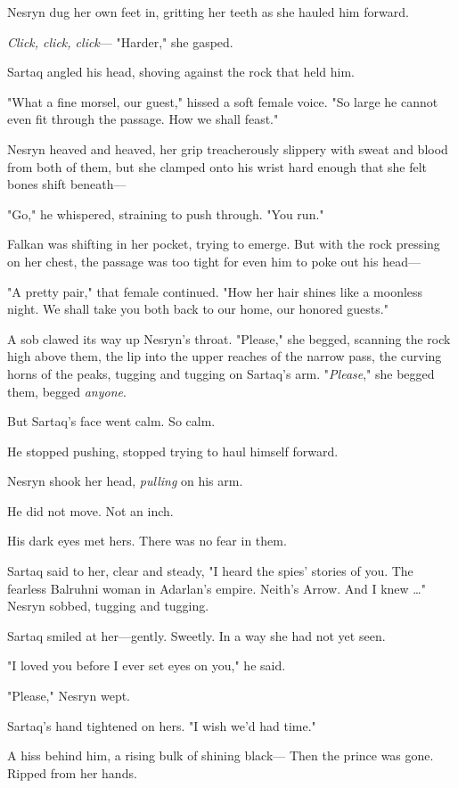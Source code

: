 Nesryn dug her own feet in, gritting her teeth as she hauled him forward.

\emph{Click, click, click}--- "Harder," she gasped.

Sartaq angled his head, shoving against the rock that held him.

"What a fine morsel, our guest," hissed a soft female voice. "So large he cannot even fit through the passage. How we shall feast."

Nesryn heaved and heaved, her grip treacherously slippery with sweat and blood from both of them, but she clamped onto his wrist hard enough that she felt bones shift beneath---

"Go," he whispered, straining to push through. "You run."

Falkan was shifting in her pocket, trying to emerge. But with the rock pressing on her chest, the passage was too tight for even him to poke out his head---

"A pretty pair," that female continued. "How her hair shines like a moonless night. We shall take you both back to our home, our honored guests."

A sob clawed its way up Nesryn's throat. "Please," she begged, scanning the rock high above them, the lip into the upper reaches of the narrow pass, the curving horns of the peaks, tugging and tugging on Sartaq's arm. "\emph{Please}," she begged them, begged \emph{anyone}.

But Sartaq's face went calm. So calm.

He stopped pushing, stopped trying to haul himself forward.

Nesryn shook her head, \emph{pulling} on his arm.

He did not move. Not an inch.

His dark eyes met hers. There was no fear in them.

Sartaq said to her, clear and steady, "I heard the spies' stories of you. The fearless Balruhni woman in Adarlan's empire. Neith's Arrow. And I knew \ldots" Nesryn sobbed, tugging and tugging.

Sartaq smiled at her---gently. Sweetly. In a way she had not yet seen.

"I loved you before I ever set eyes on you," he said.

"Please," Nesryn wept.

Sartaq's hand tightened on hers. "I wish we'd had time."

A hiss behind him, a rising bulk of shining black--- Then the prince was gone. Ripped from her hands.


